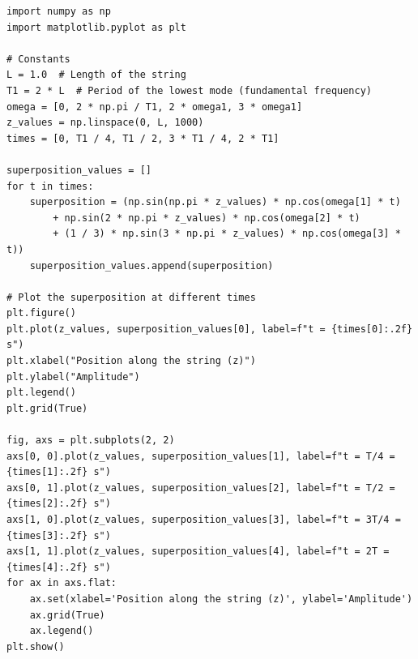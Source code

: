 \documentclass{article}
\begin{document}
\begin{lstlisting}
import numpy as np
import matplotlib.pyplot as plt

# Constants
L = 1.0  # Length of the string
T1 = 2 * L  # Period of the lowest mode (fundamental frequency)
omega = [0, 2 * np.pi / T1, 2 * omega1, 3 * omega1]
z_values = np.linspace(0, L, 1000)
times = [0, T1 / 4, T1 / 2, 3 * T1 / 4, 2 * T1]

superposition_values = []
for t in times:
    superposition = (np.sin(np.pi * z_values) * np.cos(omega[1] * t)
        + np.sin(2 * np.pi * z_values) * np.cos(omega[2] * t)
        + (1 / 3) * np.sin(3 * np.pi * z_values) * np.cos(omega[3] * t))
    superposition_values.append(superposition)

# Plot the superposition at different times
plt.figure()
plt.plot(z_values, superposition_values[0], label=f"t = {times[0]:.2f} s")
plt.xlabel("Position along the string (z)")
plt.ylabel("Amplitude")
plt.legend()
plt.grid(True)

fig, axs = plt.subplots(2, 2)
axs[0, 0].plot(z_values, superposition_values[1], label=f"t = T/4 = {times[1]:.2f} s")
axs[0, 1].plot(z_values, superposition_values[2], label=f"t = T/2 = {times[2]:.2f} s")
axs[1, 0].plot(z_values, superposition_values[3], label=f"t = 3T/4 = {times[3]:.2f} s")
axs[1, 1].plot(z_values, superposition_values[4], label=f"t = 2T = {times[4]:.2f} s")
for ax in axs.flat:
    ax.set(xlabel='Position along the string (z)', ylabel='Amplitude')
    ax.grid(True)
    ax.legend()
plt.show()
\end{lstlisting}
\clearpage
\end{document}
